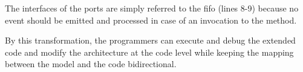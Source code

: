 \begin{minipage}{0.95\columnwidth}
	
\end{minipage}

The interfaces of the  ports are simply referred to the fifo (lines 8-9) because no event should be emitted and processed in case of an invocation to the  method.  

By this transformation, the programmers can execute and debug the extended code and modify the architecture at the code level while keeping the mapping between the model and the code bidirectional.





